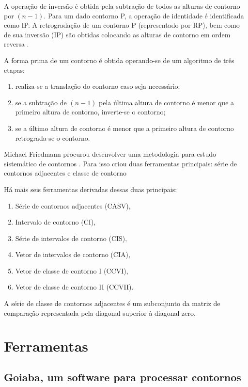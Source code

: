 A operação de inversão é obtida pela subtração de todos as alturas de
contorno por $(n-1)$. Para um dado contorno P, a operação de
identidade é identificada como IP. A retrogradação de um contorno P
(representado por RP), bem como de sua inversão (IP) são obtidas
colocando as alturas de contorno em ordem reversa
\cite[p. 231]{marvin.ea87:relating}.

A forma prima de um contorno é obtida operando-se de um algoritmo de
três etapas:
\begin{enumerate}
\item realiza-se a translação do contorno caso seja necessário;
\item se a subtração de $(n-1)$ pela última altura de contorno é menor
  que a primeiro altura de contorno, inverte-se o contorno;
\item se a último altura de contorno é menor que a primeiro altura de
  contorno retrograda-se o contorno.
\end{enumerate}

Michael Friedmann procurou desenvolver uma metodologia para estudo
sistemático de contornos \cite{friedmann85:methodology}. Para isso
criou duas ferramentas principais: série de contornos adjacentes e
classe de contorno

Há mais seis ferramentas derivadas dessas duas principais:

\begin{enumerate}
\item Série de contornos adjacentes (CASV),
\item Intervalo de contorno (CI),
\item Série de intervalos de contorno (CIS),
\item Vetor de intervalos de contorno (CIA),
\item Vetor de classe de contorno I (CCVI),
\item Vetor de classe de contorno II (CCVII).
\end{enumerate}

A série de classe de contornos adjacentes é um subconjunto da matriz
de comparação representada pela diagonal superior à diagonal zero.

\chapter{Ferramentas}
\label{cha:ferramentas}


\section{Goiaba, um software para processar contornos}
\label{sec:goiaba-software-para}

